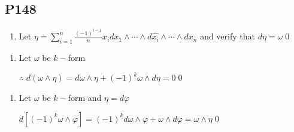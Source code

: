 \subsection{P148}
\begin{enumerate}[10]
    \item
    Let $\eta =\sum\limits_{i=1}^n \frac{(-1)^{i-1}}{n}x_i dx_1\wedge \cdots \wedge d \hat{x_i} \wedge \cdots \wedge dx_n$ and verify that $d\eta = \omega $\qed
    \end{enumerate}
    \begin{enumerate}[11]
    \item
    Let $\omega$ be $k-$form
    \par $\therefore$ $d(\omega \wedge \eta)=d\omega\wedge\eta+(-1)^k \omega\wedge d\eta =0$\qed
    \end{enumerate}
    \begin{enumerate}[12]
    \item
    Let $\omega$ be $k-$form and $\eta=d\varphi$
    \par $d[(-1)^k\omega\wedge\varphi]=(-1)^kd\omega\wedge\varphi+\omega\wedge d\varphi=\omega\wedge\eta $\qed
\end{enumerate}
